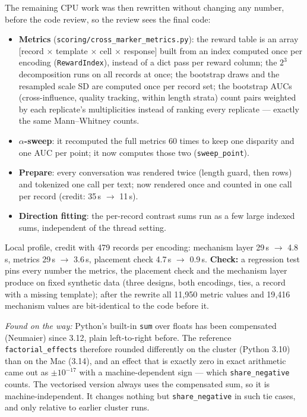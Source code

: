\documentclass{article}
\begin{document}
The remaining CPU work was then rewritten without changing any number, before the code review, so the review sees
the final code:
\begin{itemize}
  \item \textbf{Metrics} (\texttt{scoring/cross\_marker\_metrics.py}): the reward table is an array
        [record $\times$ template $\times$ cell $\times$ response] built from an index computed once per encoding
        (\texttt{RewardIndex}), instead of a dict pass per reward column; the $2^3$ decomposition runs on all
        records at once; the bootstrap draws and the resampled scale SD are computed once per record set; the
        bootstrap AUCs (cross-influence, quality tracking, within length strata) count pairs weighted by each
        replicate's multiplicities instead of ranking every replicate --- exactly the same Mann--Whitney counts.
  \item \textbf{$\alpha$-sweep}: it recomputed the full metrics 60 times to keep one disparity and one AUC per point;
        it now computes those two (\texttt{sweep\_point}).
  \item \textbf{Prepare}: every conversation was rendered twice (length guard, then rows) and tokenized one call
        per text; now rendered once and counted in one call per record (credit: 35\,s $\to$ 11\,s).
  \item \textbf{Direction fitting}: the per-record contrast sums run as a few large indexed sums, independent of
        the thread setting.
\end{itemize}
Local profile, credit with 479 records per encoding: mechanism layer 29\,s $\to$ 4.8\,s, metrics 29\,s $\to$ 3.6\,s,
placement check 4.7\,s $\to$ 0.9\,s. \textbf{Check:} a regression test pins every number the metrics, the placement
check and the mechanism layer produce on fixed synthetic data (three designs, both encodings, ties, a record with a
missing template); after the rewrite all 11{,}950 metric values and 19{,}416 mechanism values are bit-identical to
the code before it.

\emph{Found on the way:} Python's built-in \texttt{sum} over floats has been compensated (Neumaier) since 3.12, plain
left-to-right before. The reference \texttt{factorial\_effects} therefore rounded differently on the cluster
(Python 3.10) than on the Mac (3.14), and an effect that is exactly zero in exact arithmetic came out as
$\pm 10^{-17}$ with a machine-dependent sign --- which \texttt{share\_negative} counts. The vectorised version
always uses the compensated sum, so it is machine-independent. It changes nothing but \texttt{share\_negative} in
such tie cases, and only relative to earlier cluster runs.
\end{document}
